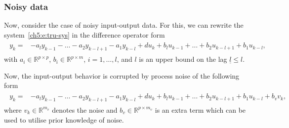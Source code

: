 \begin{comment}
\begin{remark}
In Thm.~\ref{thm:3}, a necessary and sufficient condition for $(Q,S,R)$-dissipativity is given, which can be extended to cyclo-dissipativity for $P \nsucceq 0$. However, for $l > \underline{l}$ it is generally difficult to verify strict dissipativity (with $P \succ 0$ and a strict definiteness condition in \eqref{eq:opt_output}), since $\begin{bmatrix}\Xi\\U_\Xi\end{bmatrix}$ does usually not have full row rank in these cases. Finding conditions for strict dissipativity from input-output data with $l >\underline{l}$ is therefore an interesting issue for future research.
\end{remark}
\end{comment}
\subsubsection{Noisy data}

\label{sec:output_noise}
%
Now, consider the case of noisy input-output data. For this, we can rewrite the system~\eqref{ch5:e:tru-sys} in the difference operator form
\begin{align}
\begin{split}
 y_k = &-a_{l} y_{k-1} - \dots - a_2 y_{k-l+1} - a_1 y_{k-l} + d u_{k} + b_{l} u_{k-1} + \dots + b_2 u_{k-l+1} + b_1 u_{k-l},
\end{split}
\label{eq:sys_diff}
\end{align}
with $a_i \in \mathbb{R}^{p \times p}$, $b_i \in \mathbb{R}^{p \times m}$, $i=1, \dots, l$, and $l$ is an upper bound on the lag $\underline{l} \leq l$.

Now, the input-output behavior is corrupted by process noise of the following form
\begin{align}
\begin{split}
 y_k = &-a_{l} y_{k-1} - \dots - a_2 y_{k-l+1} - a_1 y_{k-l} + d u_{k} + b_{l} u_{k-1} + \dots + b_2 u_{k-l+1} + b_1 u_{k-l} + b_v v_k,
\end{split}
\label{eq:sys_diff_with_noise}
\end{align}
where $v_k \in \mathbb{R}^{m_v}$ denotes the noise and $b_v \in \mathbb{R}^{p \times m_v}$ is an extra term which can be used to utilise prior knowledge of noise. 

